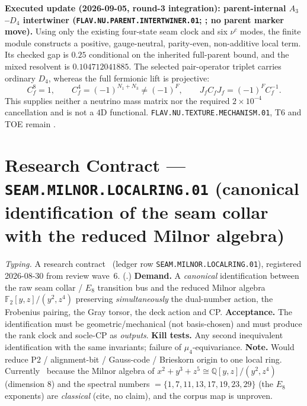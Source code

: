 \par\smallskip\noindent\textbf{Executed update (2026-09-05, round-3 integration):
parent-internal $A_3$--$D_4$ intertwiner
(\texttt{FLAV.NU.PARENT.INTERTWINER.01};
; no parent
marker move).}
Using only the existing four-state seam clock and six $\nu^c$ modes, the finite module
constructs a positive, gauge-neutral, parity-even, non-additive local term.  Its checked
gap is $0.25$ conditional on the inherited full-parent bound, and the mixed resolvent is
$0.104712041885$.  The selected pair-operator triplet carries ordinary $D_4$, whereas
the full fermionic lift is projective:
\[
 C_f^8=1,\qquad C_f^4=(-1)^{N_1+N_3}\ne(-1)^F,\qquad
 J_fC_fJ_f=(-1)^F C_f^{-1}.
\]
This supplies neither a neutrino mass matrix nor the required
$2{\times}10^{-4}$ cancellation and is not a $4$D functional.
\texttt{FLAV.NU.TEXTURE.MECHANISM.01}, T6 and TOE remain \mO.

\section*{Research Contract --- \texttt{SEAM.MILNOR.LOCALRING.01} (canonical identification of the seam collar with the reduced Milnor algebra)}
\noindent\emph{Typing.} A research contract \mO\ (ledger row
\texttt{SEAM.MILNOR.LOCALRING.01}), registered 2026-08-30 from review wave~6.
(.)
\textbf{Demand.}  A \emph{canonical} identification between the raw seam collar / $E_8$
transition bus and the reduced Milnor algebra $\mathbb F_2[y,z]/(y^2,z^4)$ preserving
\emph{simultaneously} the dual-number action, the Frobenius pairing, the Gray torsor, the
deck action and CP.  \textbf{Acceptance.}  The identification must be geometric/mechanical
(not basis-chosen) and must produce the rank clock and socle-CP as \emph{outputs}.
\textbf{Kill tests.}  Any second inequivalent identification with the same invariants; failure
of $\mu_4$-equivariance.  \textbf{Note.}  Would reduce P2 / alignment-bit / Gauss-code /
Brieskorn origin to one local ring.  Currently \mO\ because the Milnor algebra of
$x^2+y^3+z^5\cong\mathbb Q[y,z]/(y^2,z^4)$ (dimension $8$) and the spectral numbers
$=\{1,7,11,13,17,19,23,29\}$ (the $E_8$ exponents) are \emph{classical} (cite, no claim),
and the corpus map is unproven.

